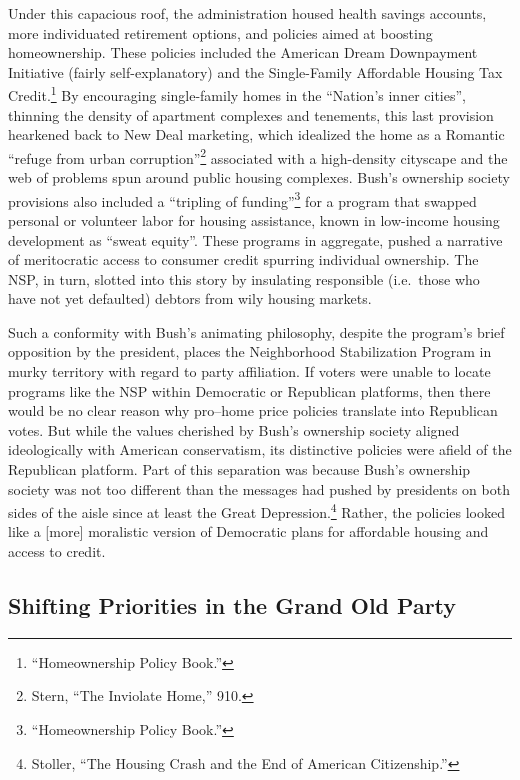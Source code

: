 \documentclass[
]{article}
\begin{document}
Under this capacious roof, the administration housed health savings accounts, more individuated retirement options, and policies aimed at boosting homeownership.
These policies included the American Dream Downpayment Initiative (fairly self-explanatory) and the Single-Family Affordable Housing Tax Credit.\footnote{``Homeownership Policy Book.''}
By encouraging single-family homes in the ``Nation's inner cities'', thinning the density of apartment complexes and tenements, this last provision hearkened back to New Deal marketing, which idealized the home as a Romantic ``refuge from urban corruption''\footnote{Stern, ``The Inviolate Home,'' 910.} associated with a high-density cityscape and the web of problems spun around public housing complexes.
Bush's ownership society provisions also included a ``tripling of funding''\footnote{``Homeownership Policy Book.''} for a program that swapped personal or volunteer labor for housing assistance, known in low-income housing development as ``sweat equity''.
These programs in aggregate, pushed a narrative of meritocratic access to consumer credit spurring individual ownership.
The NSP, in turn, slotted into this story by insulating responsible (i.e.~those who have not yet defaulted) debtors from wily housing markets.

Such a conformity with Bush's animating philosophy, despite the program's brief opposition by the president, places the Neighborhood Stabilization Program in murky territory with regard to party affiliation.
If voters were unable to locate programs like the NSP within Democratic or Republican platforms, then there would be no clear reason why pro--home price policies translate into Republican votes.
But while the values cherished by Bush's ownership society aligned ideologically with American conservatism, its distinctive policies were afield of the Republican platform.
Part of this separation was because Bush's ownership society was not too different than the messages had pushed by presidents on both sides of the aisle since at least the Great Depression.\footnote{Stoller, ``The Housing Crash and the End of American Citizenship.''}
Rather, the policies looked like a {[}more{]} moralistic version of Democratic plans for affordable housing and access to credit.

\hypertarget{shifting-priorities-in-the-grand-old-party}{%
\subsection{Shifting Priorities in the Grand Old Party}\label{shifting-priorities-in-the-grand-old-party}}
\end{document}
